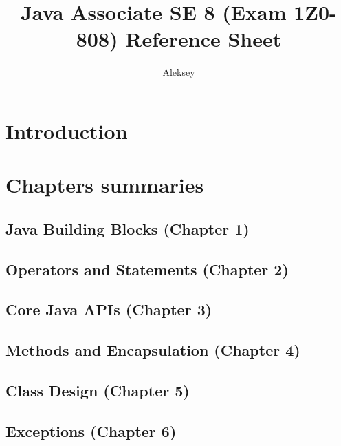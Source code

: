 \documentclass[10pt,a4paper]{article}
\title{Java Associate SE 8 (Exam 1Z0-808) Reference Sheet}
\author{Aleksey}
\date{}
\begin{document}
\maketitle
\tableofcontents

\section{Introduction}

\section{Chapters summaries}
\subsection{Java Building Blocks (Chapter 1)}
\subsection{Operators and Statements (Chapter 2)}
\subsection{Core Java APIs (Chapter 3)}
\subsection{Methods and Encapsulation (Chapter 4)}
\subsection{Class Design (Chapter 5)}
\subsection{Exceptions (Chapter 6)}
\end{document}
